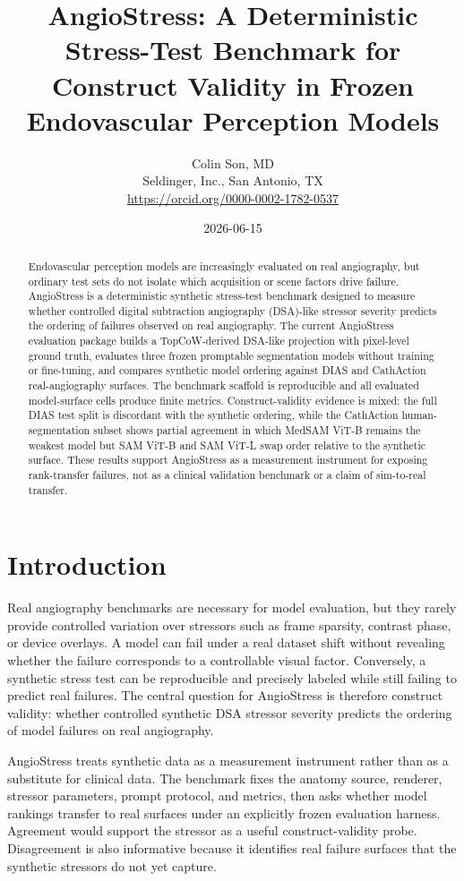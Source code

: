 \documentclass[11pt]{article}
\title{AngioStress: A Deterministic Stress-Test Benchmark for Construct Validity in Frozen Endovascular Perception Models}
\author{Colin Son, MD\\Seldinger, Inc., San Antonio, TX\\\url{https://orcid.org/0000-0002-1782-0537}}
\date{2026-06-15}
\begin{document}
\maketitle

\begin{abstract}

Endovascular perception models are increasingly evaluated on real angiography, but ordinary test sets do not isolate which acquisition or scene factors drive failure. AngioStress is a deterministic synthetic stress-test benchmark designed to measure whether controlled digital subtraction angiography (DSA)-like stressor severity predicts the ordering of failures observed on real angiography. The current AngioStress evaluation package builds a TopCoW-derived DSA-like projection with pixel-level ground truth, evaluates three frozen promptable segmentation models without training or fine-tuning, and compares synthetic model ordering against DIAS and CathAction real-angiography surfaces. The benchmark scaffold is reproducible and all evaluated model-surface cells produce finite metrics. Construct-validity evidence is mixed: the full DIAS test split is discordant with the synthetic ordering, while the CathAction human-segmentation subset shows partial agreement in which MedSAM ViT-B remains the weakest model but SAM ViT-B and SAM ViT-L swap order relative to the synthetic surface. These results support AngioStress as a measurement instrument for exposing rank-transfer failures, not as a clinical validation benchmark or a claim of sim-to-real transfer.


\end{abstract}

\section*{Introduction}

Real angiography benchmarks are necessary for model evaluation, but they rarely provide controlled variation over stressors such as frame sparsity, contrast phase, or device overlays. A model can fail under a real dataset shift without revealing whether the failure corresponds to a controllable visual factor. Conversely, a synthetic stress test can be reproducible and precisely labeled while still failing to predict real failures. The central question for AngioStress is therefore construct validity: whether controlled synthetic DSA stressor severity predicts the ordering of model failures on real angiography.


AngioStress treats synthetic data as a measurement instrument rather than as a substitute for clinical data. The benchmark fixes the anatomy source, renderer, stressor parameters, prompt protocol, and metrics, then asks whether model rankings transfer to real surfaces under an explicitly frozen evaluation harness. Agreement would support the stressor as a useful construct-validity probe. Disagreement is also informative because it identifies real failure surfaces that the synthetic stressors do not yet capture.
\end{document}
